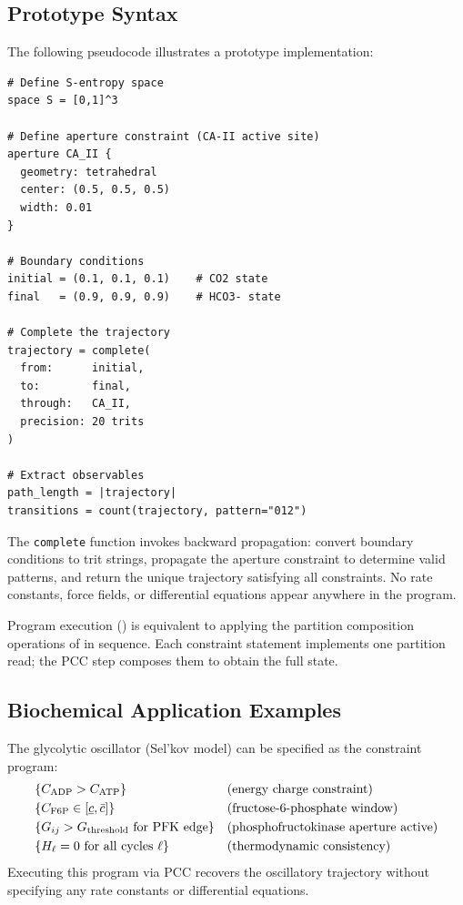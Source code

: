 \subsection{Prototype Syntax}

The following pseudocode illustrates a prototype implementation:
\begin{verbatim}
# Define S-entropy space
space S = [0,1]^3

# Define aperture constraint (CA-II active site)
aperture CA_II {
  geometry: tetrahedral
  center: (0.5, 0.5, 0.5)
  width: 0.01
}

# Boundary conditions
initial = (0.1, 0.1, 0.1)    # CO2 state
final   = (0.9, 0.9, 0.9)    # HCO3- state

# Complete the trajectory
trajectory = complete(
  from:      initial,
  to:        final,
  through:   CA_II,
  precision: 20 trits
)

# Extract observables
path_length = |trajectory|
transitions = count(trajectory, pattern="012")
\end{verbatim}

The \texttt{complete} function invokes backward propagation: convert boundary
conditions to trit strings, propagate the aperture constraint to determine
valid patterns, and return the unique trajectory satisfying all constraints.
No rate constants, force fields, or differential equations appear anywhere
in the program.

\begin{proposition}
\label{prop:lang-equivalence}
Program execution () is equivalent to applying the
partition composition operations of  in sequence.
Each constraint statement implements one partition read; the PCC step composes
them to obtain the full state.
\end{proposition}

\subsection{Biochemical Application Examples}

\begin{example}
\label{ex:glycolysis}
The glycolytic oscillator (Sel'kov model) can be specified as the constraint
program:
\begin{align*}
    &\{C_\mathrm{ADP} > C_\mathrm{ATP}\}
    &&\text{(energy charge constraint)} \\
    &\{C_\mathrm{F6P} \in [\underline{c},\bar{c}]\}
    &&\text{(fructose-6-phosphate window)} \\
    &\{G_{ij} > G_\mathrm{threshold}\text{ for PFK edge}\}
    &&\text{(phosphofructokinase aperture active)} \\
    &\{H_\ell = 0 \text{ for all cycles } \ell\}
    &&\text{(thermodynamic consistency)}
\end{align*}
Executing this program via PCC recovers the oscillatory trajectory without
specifying any rate constants or differential equations.
\end{example}

